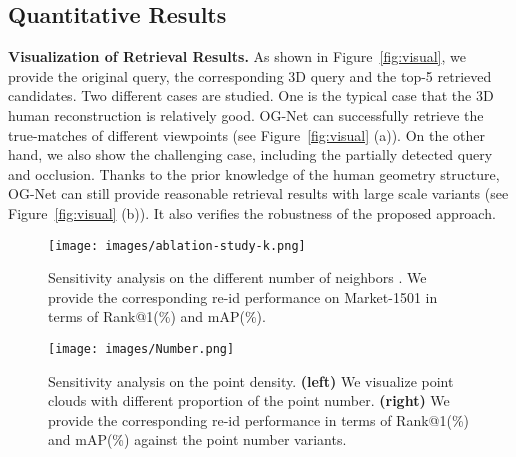 \subsection{Quantitative Results}
\textbf{Visualization of Retrieval Results.}
As shown in Figure~\ref{fig:visual}, we provide the original query, the corresponding 3D query and the top-5 retrieved candidates. Two different cases are studied. One is the typical case that the 3D human reconstruction is relatively good. OG-Net can successfully retrieve the true-matches of different viewpoints (see Figure~\ref{fig:visual} (a)). On the other hand, we also show the challenging case, including the partially detected query and occlusion. Thanks to the prior knowledge of the human geometry structure, OG-Net can still provide reasonable retrieval results with large scale variants (see Figure~\ref{fig:visual} (b)). It also verifies the robustness of the proposed approach.

\begin{figure}[t]{
\caption{Sensitivity analysis on the different number of neighbors . We provide the corresponding re-id performance on Market-1501 in terms of Rank@1(\%) and mAP(\%).  }\label{fig:ablation_k}
{\texttt{[image: images/ablation-study-k.png]}}}\end{figure}


\begin{figure}[t]{
\caption{Sensitivity analysis on the point density. \textbf{(left)} We visualize point clouds with different proportion of the point number. \textbf{(right)} We provide the corresponding re-id performance in terms of Rank@1(\%) and mAP(\%) against the point number variants.  }\label{fig:sample_num}
{\texttt{[image: images/Number.png]}}}\end{figure}

